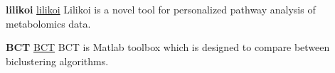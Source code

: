 \begin{cventries}
  \cventry
    {\textbf{lilikoi}}
    {}
    {}
    {}
    {
      \href{https://github.com/FADHLyemen/lilikoi_Fadhl}{lilikoi} Lilikoi is a novel tool for personalized pathway analysis of metabolomics data.
    }

  \cventry
    {\textbf{BCT}}
    {}
    {}
    {}
    {
    \href{https://github.com/FADHLyemen/BCT}{BCT}  BCT is Matlab toolbox which is designed to compare between biclustering algorithms.
    }
  
\end{cventries}
